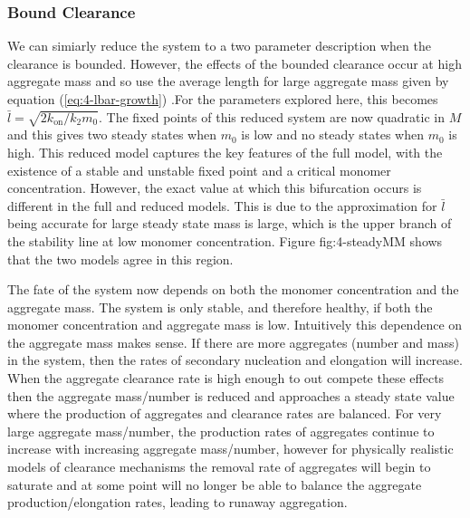 \subsubsection{Bound Clearance}

We can simiarly reduce the system to a two parameter description when the clearance is bounded. However, the effects of the bounded clearance occur at high aggregate mass and so use the average length for large aggregate mass given by equation (\ref{eq:4-lbar-growth}) .For the parameters explored here, this becomes $\bar{l} = \sqrt{2 k_\text{on}/k_2 m_0}$. The fixed points of this reduced system are now quadratic in $M$ and this gives two steady states when $m_0$ is low and no steady states when $m_0$ is high. This reduced model captures the key features of the full model, with the existence of a stable and unstable fixed point and a critical monomer concentration. However, the exact value at which this bifurcation occurs is different in the full and reduced models. This is due to the approximation for $\bar{l}$ being accurate for large steady state mass is large, which is the upper branch of the stability line at low monomer concentration. Figure {fig:4-steadyMM} shows that the two models agree in this region.

The fate of the system now depends on both the monomer concentration and the aggregate mass. The system is only stable, and therefore healthy, if both the monomer concentration and aggregate mass is low. Intuitively this dependence on the aggregate mass makes sense. If there are more aggregates (number and mass) in the system, then the rates of secondary nucleation and elongation will increase. When the aggregate clearance rate is high enough to out compete these effects then the aggregate mass/number is reduced and approaches a steady state value where the production of aggregates and clearance rates are balanced. For very large aggregate mass/number, the production rates of aggregates continue to increase with increasing aggregate mass/number, however for physically realistic models of clearance mechanisms the removal rate of aggregates will begin to saturate and at some point will no longer be able to balance the aggregate production/elongation rates, leading to runaway aggregation.


